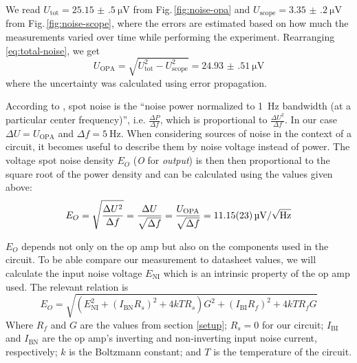 \documentclass[a4paper]{scrartcl}
\newcommand{\figref}[1]{Fig.\,\ref{#1}}
\begin{document}
We read $U_\text{tot} = \SI{25.15(50)}{\uV}$ from \figref{fig:noise-opa} and
$U_\text{scope} = \SI{3.35(20)}{\uV}$ from \figref{fig:noise-scope},
where the errors are estimated based on how much the measurements varied over time
while performing the experiment. Rearranging \eqref{eq:total-noise}, we get
\begin{equation*}
  U_\text{OPA} = \sqrt{U_\text{tot}^2 - U_\text{scope}^2} = \SI{24.93(51)}{\uV}
\end{equation*}
where the uncertainty was calculated using error propagation.

According to \cite{noise-analysis}, spot noise is the
\enquote{noise power normalized to \SI{1}{\Hz} bandwidth (at a particular center frequency)},
i.e. $\frac{\Delta P}{\Delta f}$, which is proportional to $\frac{\Delta U^2}{\Delta f}$.
In our case $\Delta U = U_\text{OPA}$ and $\Delta f = \SI{5}{\Hz}$.
When considering sources of noise in the context of a circuit, it becomes useful to describe
them by noise voltage instead of power. The voltage spot noise density $E_O$ (\textit{O} for \textit{output}) 
is then then proportional to
the square root of the power density and can be calculated using the values given above:
\begin{equation}
  E_O = \sqrt{\frac{\Delta U^2}{\Delta f}} = \frac{\Delta U}{\sqrt{\Delta f}} =
    \frac{U_\text{OPA}}{\sqrt{\Delta f}} = \SI{11.15(23)}{\uV\per\sqrt{\Hz}}
\end{equation}

$E_O$ depends not only on the op amp but also on the components used in the circuit.
To be able compare our measurement to datasheet values,
we will calculate the input noise voltage $E_\text{NI}$ which is an intrinsic property of the op amp used.
The relevant relation is \cite{noise-analysis}
\begin{equation}
  E_O = \sqrt{(E_\text{NI}^2 + (I_\text{BN}R_s)^2 + 4kTR_s)G^2 + (I_\text{BI}R_f)^2 + 4kTR_fG}
\end{equation}
Where $R_f$ and $G$ are the values from section \ref{setup}; $R_s = 0$ for our circuit; $I_\text{BI}$ and $I_\text{BN}$ are
the op amp's inverting and non-inverting input noise current, respectively;
$k$ is the Boltzmann constant; and $T$ is the temperature of the circuit.
\end{document}
